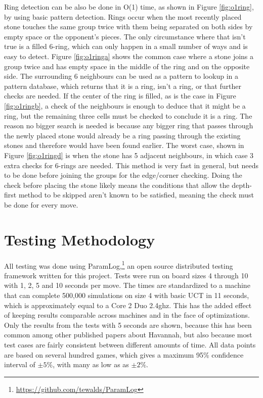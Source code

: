 Ring detection can be also be done in O(1) time, as shown in Figure \ref{fig:o1ring}, by using basic pattern detection. Rings occur when the most recently placed stone touches the same group twice with them being separated on both sides by empty space or the opponent's pieces. The only circumstance where that isn't true is a filled 6-ring, which can only happen in a small number of ways and is easy to detect. Figure \ref{fig:o1ringa} shows the common case where a stone joins a group twice and has empty space in the middle of the ring and on the opposite side. The surrounding 6 neighbours can be used as a pattern to lookup in a pattern database, which returns that it is a ring, isn't a ring, or that further checks are needed. If the center of the ring is filled, as is the case in Figure \ref{fig:o1ringb}, a check of the neighbours is enough to deduce that it might be a ring, but the remaining three cells must be checked to conclude it is a ring. The reason no bigger search is needed is because any bigger ring that passes through the newly placed stone would already be a ring passing through the existing stones and therefore would have been found earlier. The worst case, shown in Figure \ref{fig:o1ringd} is when the stone has 5 adjacent neighbours, in which case 3 extra checks for 6-rings are needed. This method is very fast in general, but needs to be done before joining the groups for the edge/corner checking. Doing the check before placing the stone likely means the conditions that allow the depth-first method to be skipped aren't known to be satisfied, meaning the check must be done for every move.



\section{Testing Methodology}

All testing was done using ParamLog,\footnote{\url{https://github.com/tewalds/ParamLog}} an open source distributed testing framework written for this project. Tests were run on board sizes 4 through 10 with 1, 2, 5 and 10 seconds per move. The times are standardized to a machine that can complete 500,000 simulations on size 4 with basic UCT in 11 seconds, which is approximately equal to a Core 2 Duo 2.4ghz. This has the added effect of keeping results comparable across machines and in the face of optimizations. Only the results from the tests with 5 seconds are shown, because this has been common among other published papers about Havannah, but also because most test cases are fairly consistent between different amounts of time. All data points are based on several hundred games, which gives a maximum 95\% confidence interval of $\pm 5\%$, with many as low as as $\pm 2\%$.


